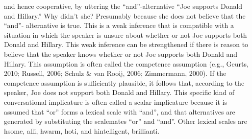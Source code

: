 \documentclass{sp}
\begin{document}
and hence cooperative, by uttering the “and”-alternative “Joe supports Donald
and Hillary.” Why didn’t she? Presumably because she does not believe that the “and”-
alternative is true. This is a weak inference that is compatible with a situation in which
the speaker is unsure about whether or not Joe supports both Donald and Hillary. This
weak inference can be strengthened if there is reason to believe that the speaker knows
whether or not Joe supports both Donald and Hillary. This assumption is often called
the competence assumption (e.g., Geurts, 2010; Russell, 2006; Schulz \& van Rooij,
2006; Zimmermann, 2000). If the competence assumption is sufficiently plausible, it
follows that, according to the speaker, Joe does not support both Donald and Hillary.
This specific kind of conversational implicature is often called a scalar implicature
because it is assumed that “or” forms a lexical scale with “and”, and that alternatives
are generated by substituting the scalemates “or” and “and”. Other lexical scales are
hsome, alli, hwarm, hoti, and hintelligent, brillianti.
\end{document}
